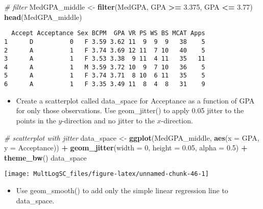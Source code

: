 \documentclass[
]{book}
\newenvironment{Shaded}{\begin{snugshade}}{\end{snugshade}}
\newcommand{\CommentTok}[1]{\textcolor[rgb]{0.56,0.35,0.01}{\textit{#1}}}
\newcommand{\DataTypeTok}[1]{\textcolor[rgb]{0.13,0.29,0.53}{#1}}
\newcommand{\DecValTok}[1]{\textcolor[rgb]{0.00,0.00,0.81}{#1}}
\newcommand{\FloatTok}[1]{\textcolor[rgb]{0.00,0.00,0.81}{#1}}
\newcommand{\KeywordTok}[1]{\textcolor[rgb]{0.13,0.29,0.53}{\textbf{#1}}}
\newcommand{\NormalTok}[1]{#1}
\newcommand{\OperatorTok}[1]{\textcolor[rgb]{0.81,0.36,0.00}{\textbf{#1}}}
\newcommand{\StringTok}[1]{\textcolor[rgb]{0.31,0.60,0.02}{#1}}
\providecommand{\tightlist}{%
  \setlength{\itemsep}{0pt}\setlength{\parskip}{0pt}}
\begin{document}
\begin{Shaded}
\begin{Highlighting}[]
\CommentTok{# filter}
\NormalTok{MedGPA_middle <-}\StringTok{ }\KeywordTok{filter}\NormalTok{(MedGPA, GPA }\OperatorTok{>=}\StringTok{ }\FloatTok{3.375}\NormalTok{, GPA }\OperatorTok{<=}\StringTok{ }\FloatTok{3.77}\NormalTok{)}
\KeywordTok{head}\NormalTok{(MedGPA_middle)}
\end{Highlighting}
\end{Shaded}

\begin{verbatim}
  Accept Acceptance Sex BCPM  GPA VR PS WS BS MCAT Apps
1      D          0   F 3.59 3.62 11  9  9  9   38    5
2      A          1   F 3.74 3.69 12 11  7 10   40    5
3      A          1   F 3.53 3.38  9 11  4 11   35   11
4      A          1   M 3.59 3.72 10  9  7 10   36    5
5      A          1   F 3.74 3.71  8 10  6 11   35    5
6      A          1   F 3.35 3.49 11  8  4  8   31    9
\end{verbatim}

\begin{itemize}
\tightlist
\item
  Create a scatterplot called data\_space for Acceptance as a function of GPA for only those observations. Use geom\_jitter() to apply 0.05 jitter to the points in the \(y\)-direction and no jitter to the \(x\)-direction.
\end{itemize}

\begin{Shaded}
\begin{Highlighting}[]
\CommentTok{# scatterplot with jitter}
\NormalTok{data_space <-}\StringTok{ }\KeywordTok{ggplot}\NormalTok{(MedGPA_middle, }\KeywordTok{aes}\NormalTok{(}\DataTypeTok{x =}\NormalTok{ GPA, }\DataTypeTok{y =}\NormalTok{ Acceptance)) }\OperatorTok{+}\StringTok{ }
\StringTok{  }\KeywordTok{geom_jitter}\NormalTok{(}\DataTypeTok{width =} \DecValTok{0}\NormalTok{, }\DataTypeTok{height =} \FloatTok{0.05}\NormalTok{, }\DataTypeTok{alpha =} \FloatTok{0.5}\NormalTok{) }\OperatorTok{+}\StringTok{ }
\StringTok{  }\KeywordTok{theme_bw}\NormalTok{()}
\NormalTok{data_space}
\end{Highlighting}
\end{Shaded}

\begin{center}\texttt{[image: MultLogSC\_files/figure-latex/unnamed-chunk-46-1]} \end{center}

\begin{itemize}
\tightlist
\item
  Use geom\_smooth() to add only the simple linear regression line to data\_space.
\end{itemize}
\end{document}
